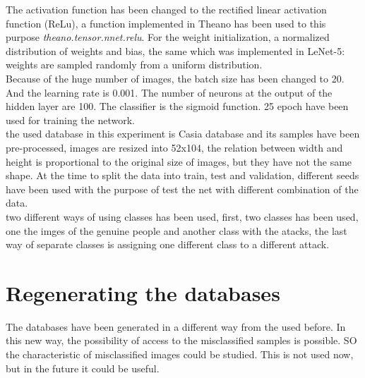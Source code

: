 The activation function has been changed to the rectified linear activation function (ReLu), a function implemented in Theano has been used to this purpose \textit{theano.tensor.nnet.relu}. For the weight initialization, a normalized distribution of weights and bias, the same which was implemented in LeNet-5: weights are sampled randomly from a uniform distribution.\\

Because of the huge number of images, the  batch size has been changed to 20. And the learning rate is 0.001. The number of neurons at the output of the hidden layer are 100. The classifier is the sigmoid function. 25 epoch have been used for training the network.\\

the used database in this experiment is Casia database and its samples have been pre-processed, images are resized into 52x104, the relation between width and height is proportional to the original size of images, but they have not the same shape. At the time to split the data into train, test and validation, different seeds have been used with the purpose of test the net with different combination of the data.\\



two different ways of using classes has been used, first, two classes has been used, one the imges of the genuine people and another class with the atacks, the last way of separate classes is assigning one different class to a different attack.\\




\section{Regenerating the databases}
The databases have been generated in a different way from the used before. In this new way, the possibility of access to the misclassified samples is possible. SO the characteristic of misclassified images could be studied. This is not used now, but in the future it could be useful.\\

